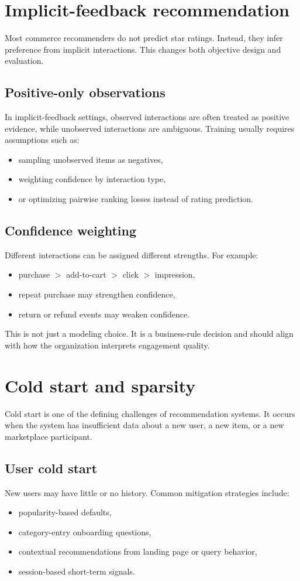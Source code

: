 \section{Implicit-feedback recommendation}
Most commerce recommenders do not predict star ratings.
Instead, they infer preference from implicit interactions.
This changes both objective design and evaluation.

\subsection{Positive-only observations}
In implicit-feedback settings, observed interactions are often treated as positive evidence, while unobserved interactions are ambiguous.
Training usually requires assumptions such as:
\begin{itemize}
  \item sampling unobserved items as negatives,
  \item weighting confidence by interaction type,
  \item or optimizing pairwise ranking losses instead of rating prediction.
\end{itemize}

\subsection{Confidence weighting}
Different interactions can be assigned different strengths.
For example:
\begin{itemize}
  \item purchase $>$ add-to-cart $>$ click $>$ impression,
  \item repeat purchase may strengthen confidence,
  \item return or refund events may weaken confidence.
\end{itemize}

This is not just a modeling choice.
It is a business-rule decision and should align with how the organization interprets engagement quality.

\section{Cold start and sparsity}
Cold start is one of the defining challenges of recommendation systems.
It occurs when the system has insufficient data about a new user, a new item, or a new marketplace participant.

\subsection{User cold start}
New users may have little or no history.
Common mitigation strategies include:
\begin{itemize}
  \item popularity-based defaults,
  \item category-entry onboarding questions,
  \item contextual recommendations from landing page or query behavior,
  \item session-based short-term signals.
\end{itemize}

